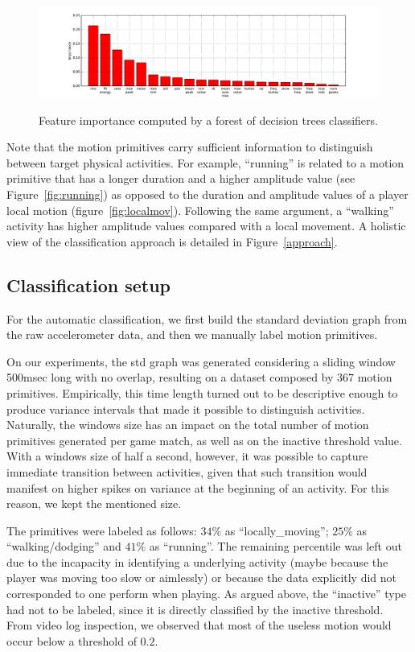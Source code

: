 \begin{figure}[htbp]
     \centering
     {\includegraphics[width=\textwidth]{images/04-activity/featureImportance}}
     \caption{Feature importance computed by a forest of decision trees classifiers.}
     \label{fig:feature_importance}
\end{figure}

Note that the motion primitives carry sufficient information to distinguish between target physical activities. For example, ``running'' is related to a motion primitive that has a longer duration and a higher amplitude value (see Figure~\ref{fig:running}) as opposed to the duration and amplitude values of a player local motion (figure~\ref{fig:localmov}). Following the same argument, a ``walking'' activity has higher amplitude values compared with a local movement. A holistic view of the classification approach is detailed in Figure~\ref{approach}. 

\subsection{Classification setup}

For the automatic classification, we first build the standard deviation graph from the raw accelerometer data, and then we manually label motion primitives. 

On our experiments, the std graph was generated considering a sliding window 500msec long with no overlap, resulting on a dataset composed by $367$ motion primitives. Empirically, this time length turned out to be descriptive enough to produce variance intervals that made it possible to distinguish activities. Naturally, the windows size has an impact on the total number of motion primitives generated per game match, as well as on the inactive threshold value. With a windows size of half a second, however, it was possible to capture immediate transition between activities, given that such transition would manifest on higher spikes on variance at the beginning of an activity. For this reason, we kept the mentioned size. 

The primitives were labeled as follows: $34\%$ as ``locally\_moving''; $25\%$ as ``walking/dodging'' and $41\%$ as ``running''. The remaining percentile was left out due to the incapacity in identifying a underlying activity (maybe because the player was moving too slow or aimlessly) or because the data explicitly did not corresponded to one perform when playing. As argued above, the ``inactive'' type had not to be labeled, since it is directly classified by the inactive threshold. From video log inspection, we observed that most of the useless motion would occur below a threshold of $0.2$.


